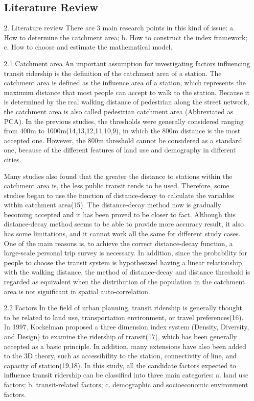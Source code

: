 \subsection{Literature Review}
2. Literature review
There are 3 main research points in this kind of issue: a. How to determine the catchment area; b. How to construct the index framework; c. How to choose and estimate the mathematical model.

2.1 Catchment area
An important assumption for investigating factors influencing transit ridership is the definition of the catchment area of a station. The catchment area is defined as the influence area of a station, which represents the maximum distance that most people can accept to walk to the station. Because it is determined by the real walking distance of pedestrian along the street network, the catchment area is also called pedestrian catchment area (Abbreviated as PCA). In the previous studies, the thresholds were generally considered ranging from 400m to 1000m(14,13,12,11,10,9), in which the 800m distance is the most accepted one. However, the 800m threshold cannot be considered as a standard one, because of the different features of land use and demography in different cities.

Many studies also found that the greater the distance to stations within the catchment area is, the less public transit tends to be used. Therefore, some studies began to use the function of distance-decay to calculate the variables within catchment area(15). The distance-decay method now is gradually becoming accepted and it has been proved to be closer to fact. Although this distance-decay method seems to be able to provide more accuracy result, it also has some limitations, and it cannot work all the same for different study cases. One of the main reasons is, to achieve the correct distance-decay function, a large-scale personal trip survey is necessary. In addition, since the probability for people to choose the transit system is hypothesized having a linear relationship with the walking distance, the method of distance-decay and distance threshold is regarded as equivalent when the distribution of the population in the catchment area is not significant in spatial auto-correlation.

2.2 Factors
In the field of urban planning, transit ridership is generally thought to be related to land use, transportation environment, or travel preferences(16). In 1997, Kockelman proposed a three dimension index system (Density, Diversity, and Design) to examine the ridership of transit(17), which has been generally accepted as a basic principle. In addition, many extensions have also been added to the 3D theory, such as accessibility to the station, connectivity of line, and capacity of station(19,18). In this study, all the candidate factors expected to influence transit ridership can be classified into three main categories: a. land use factors; b. transit-related factors; c. demographic and socioeconomic environment factors.

